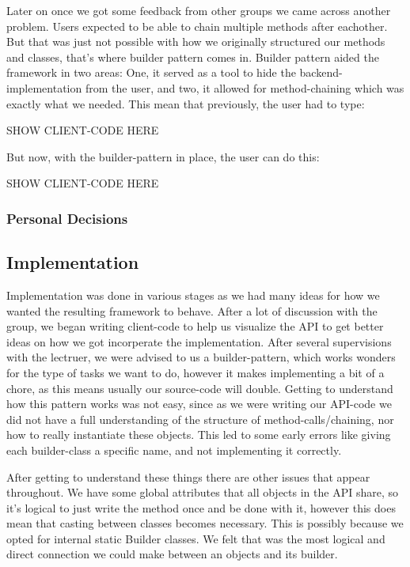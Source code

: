 \documentclass[12pt]{article}
\begin{document}
        Later on once we got some feedback from other groups we came across another problem. Users expected to be able to chain multiple methods after eachother. But that was just not possible with how we originally structured our methods and classes, that's where builder pattern comes in. Builder pattern aided the framework in two areas: One, it served as a tool to hide the backend-implementation from the user, and two, it allowed for method-chaining which was exactly what we needed. This mean that previously, the user had to type:

        SHOW CLIENT-CODE HERE

        But now, with the builder-pattern in place, the user can do this:

        SHOW CLIENT-CODE HERE

        \subsubsection{Personal Decisions}



    \subsection{Implementation}
    Implementation was done in various stages as we had many ideas for how we wanted the resulting framework to behave. After a lot of discussion with the group, we began writing client-code to help us visualize the API to get better ideas on how we got incorperate the implementation. After several supervisions with the lectruer, we were advised to us a builder-pattern, which works wonders for the type of tasks we want to do, however it makes implementing a bit of a chore, as this means usually our source-code will double. Getting to understand how this pattern works was not easy, since as we were writing our API-code we did not have a full understanding of the structure of method-calls/chaining, nor how to really instantiate these objects. This led to some early errors like giving each builder-class a specific name, and not implementing it correctly.

    After getting to understand these things there are other issues that appear throughout. We have some global attributes that all objects in the API share, so it's logical to just write the method once and be done with it, however this does mean that casting between classes becomes necessary. This is possibly because we opted for internal static Builder classes. We felt that was the most logical and direct connection we could make between an objects and its builder.
\end{document}
